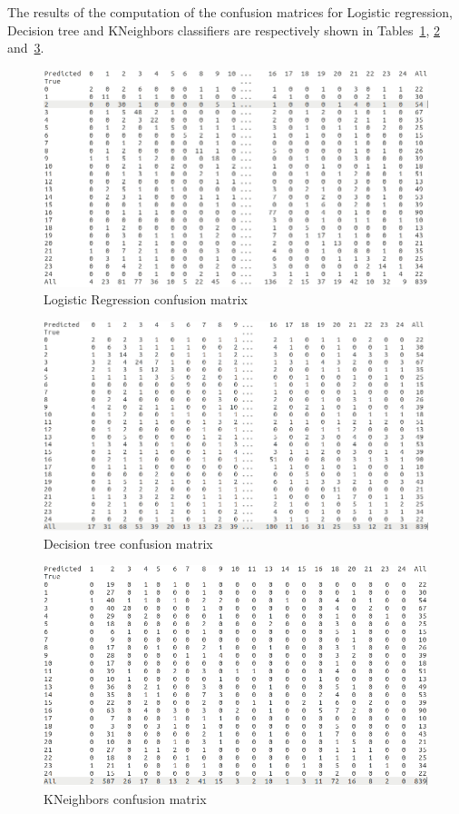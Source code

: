 \documentclass{article} %
\begin{document}
 
 The results of the computation of the confusion matrices for  Logistic regression, Decision tree and KNeighbors classifiers are respectively shown in Tables~\ref{fig:lr_con.png}, \ref{fig:dc_con.png} and~\ref{fig:kn_con.png}.
\hfill
\begin{figure}[H]
	\includegraphics[width=\linewidth]{lr_con.png}
	\caption{Logistic Regression confusion matrix}
	\label{fig:lr_con.png}
\end{figure}
\hfill
\begin{figure}[H]
	\includegraphics[width=\linewidth]{dc_con.png}
	\caption{Decision tree confusion matrix}
	\label{fig:dc_con.png}
\end{figure}
\hfill
\begin{figure}[H]
	\includegraphics[width=\linewidth]{kn_con.png}
	\caption{KNeighbors confusion matrix}
	\label{fig:kn_con.png}
\end{figure}
\end{document}
